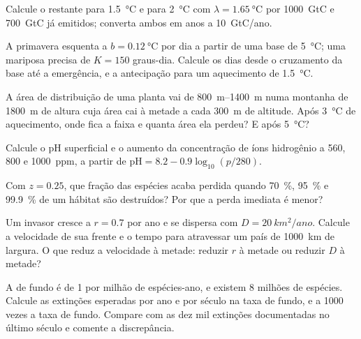\begin{exercise}[$\star\star$]\label{exo:b2:global-change:5}
Calcule o  restante para \qty{1.5}{\celsius} e para
\qty{2}{\celsius} com $\lambda = \qty{1.65}{\celsius}$ por
\qty{1000}{GtC} e \qty{700}{GtC} já emitidos; converta ambos em
anos a \qty{10}{GtC/ano}.
\end{exercise}

\begin{exercise}[$\star\star$]\label{exo:b2:global-change:6}
A primavera esquenta a $b = \qty{0.12}{\celsius}$ por dia a partir de
uma base de \qty{5}{\celsius}; uma mariposa precisa de $K = 150$
graus-dia. Calcule os dias desde o cruzamento da base até a emergência,
e a antecipação para um aquecimento de \qty{1.5}{\celsius}.
\end{exercise}

\begin{exercise}[$\star\star$]\label{exo:b2:global-change:7}
A área de distribuição de uma planta vai de \qtyrange{800}{1400}{m} numa
montanha de \qty{1800}{m} de altura cuja área cai à metade a cada
\qty{300}{m} de altitude. Após \qty{3}{\celsius} de aquecimento, onde
fica a faixa e quanta área ela perdeu? E após \qty{5}{\celsius}?
\end{exercise}

\begin{exercise}[$\star\star$]\label{exo:b2:global-change:8}
Calcule o pH superficial e o aumento da concentração de íons hidrogênio
a 560, 800 e \qty{1000}{ppm}, a partir de $\mathrm{pH} = 8.2 -
0.9\log_{10}(p/280)$.
\end{exercise}

\begin{exercise}[$\star\star$]\label{exo:b2:global-change:9}
Com $z = 0.25$, que fração das espécies acaba perdida quando
\qty{70}{\%}, \qty{95}{\%} e \qty{99.9}{\%} de um hábitat são
destruídos? Por que a perda imediata é menor?
\end{exercise}

\begin{exercise}[$\star\star\star$]\label{exo:b2:global-change:10}
Um invasor cresce a $r = 0.7$ por ano e se dispersa com $D =
\qty{20}{km^2/ano}$. Calcule a velocidade de sua frente e o tempo para
atravessar um país de \qty{1000}{km} de largura. O que reduz a
velocidade à metade: reduzir $r$ à metade ou reduzir $D$ à metade?
\end{exercise}

\begin{exercise}[$\star\star\star$]\label{exo:b2:global-change:11}
A  de fundo é de 1 por milhão de espécies-ano, e existem
8 milhões de espécies. Calcule as extinções esperadas por ano e por
século na taxa de fundo, e a 1000 vezes a taxa de fundo. Compare com as
dez mil extinções documentadas no último século e comente a
discrepância.
\end{exercise}

